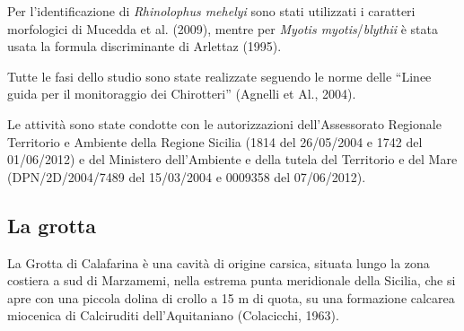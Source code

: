\begin{multicols}{2}
Per l'identificazione di \emph{Rhinolophus mehelyi} sono stati utilizzati i caratteri morfologici di Mucedda et al. (2009), mentre per \emph{Myotis myotis}/\emph{blythii} è stata usata la formula discriminante di Arlettaz (1995).

Tutte le fasi dello studio sono state realizzate seguendo le norme delle ``Linee guida per il monitoraggio dei Chirotteri'' (Agnelli et Al., 2004). 

Le attività sono state condotte con le autorizzazioni dell’Assessorato Regionale Territorio e Ambiente della Regione Sicilia (1814 del 26/05/2004 e 1742 del 01/06/2012) e del Ministero dell’Ambiente e della tutela del Territorio e del Mare (DPN/2D/2004/7489 del 15/03/2004 e 0009358 del 07/06/2012).

\subsection*{La grotta}
La Grotta di Calafarina è una cavità di origine carsica, situata lungo la zona costiera a sud di Marzamemi, nella estrema punta meridionale della Sicilia, che si apre con una piccola dolina di crollo a 15 m di quota, su una formazione calcarea miocenica di Calciruditi dell'Aquitaniano (Colacicchi, 1963). 


\end{multicols}
